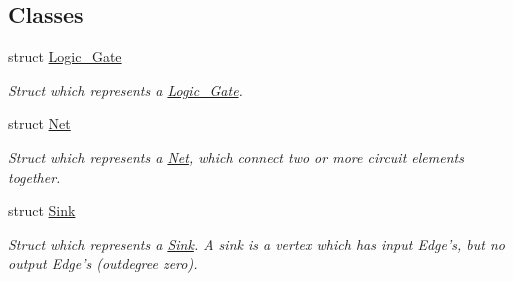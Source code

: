 \subsection*{Classes}
\begin{DoxyCompactItemize}
\item 
struct \hyperlink{structCircuit__Netlist_1_1Logic__Gate}{Logic\-\_\-\-Gate}
\begin{DoxyCompactList}\small\item\em Struct which represents a \hyperlink{structCircuit__Netlist_1_1Logic__Gate}{Logic\-\_\-\-Gate}. \end{DoxyCompactList}\item 
struct \hyperlink{structCircuit__Netlist_1_1Net}{Net}
\begin{DoxyCompactList}\small\item\em Struct which represents a \hyperlink{structCircuit__Netlist_1_1Net}{Net}, which connect two or more circuit elements together. \end{DoxyCompactList}\item 
struct \hyperlink{structCircuit__Netlist_1_1Sink}{Sink}
\begin{DoxyCompactList}\small\item\em Struct which represents a \hyperlink{structCircuit__Netlist_1_1Sink}{Sink}. A sink is a vertex which has input Edge's, but no output Edge's (outdegree zero). \end{DoxyCompactList}\end{DoxyCompactItemize}
